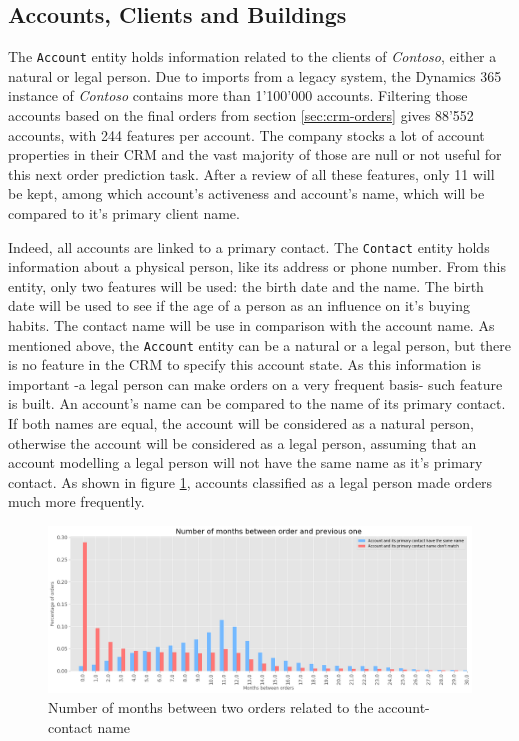 \subsection{Accounts, Clients and Buildings}\label{sec:crm-accounts}
The \texttt{Account} entity holds information related to the clients of \textit{Contoso}, either a natural or legal person. Due to imports from a legacy system, the Dynamics 365 instance of \textit{Contoso} contains more than 1'100'000 accounts. Filtering those accounts based on the final orders from section \ref{sec:crm-orders} gives 88'552 accounts, with 244 features per account. The company stocks a lot of account properties in their CRM and the vast majority of those are null or not useful for this next order prediction task. After a review of all these features, only 11 will be kept, among which account's activeness and account's name, which will be compared to it's primary client name.

Indeed, all accounts are linked to a primary contact. The \texttt{Contact} entity holds information about a physical person, like its address or phone number. From this entity, only two features will be used: the birth date and the name. The birth date will be used to see if the age of a person as an influence on it's buying habits. The contact name will be use in comparison with the account name. As mentioned above, the \texttt{Account} entity can be a natural or a legal person, but there is no feature in the CRM to specify this account state. As this information is important -a legal person can make orders on a very frequent basis- such feature is built. An account's name can be compared to the name of its primary contact. If both names are equal, the account will be considered as a natural person, otherwise the account will be considered as a legal person, assuming that an account modelling a legal person will not have the same name as it's primary contact. As shown in figure \ref{fig:account-contact-name-orders}, accounts classified as a legal person made orders much more frequently.

\begin{figure}[h]
    \centering
    \includegraphics[width=15cm]{images/account-contact-name-orders.png}
    \caption[Account and contact's name influence of order's frequency]{Number of months between two orders related to the account-contact name}
    \label{fig:account-contact-name-orders}
\end{figure}

